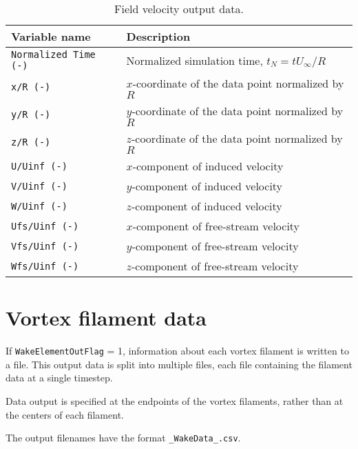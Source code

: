 \begin{table}[!htbp]
\centering
\caption{Field velocity output data.}
\label{tbl:output_cartesian_velocity}
\begin{tabular}{p{}p{}}
\toprule
Variable name & Description \\ \midrule
\texttt{Normalized Time (-)} & Normalized simulation time, $t_N=t U_\infty/R$ \\
\texttt{x/R (-)}             & $x$-coordinate of the data point normalized by $R$ \\
\texttt{y/R (-)}             & $y$-coordinate of the data point normalized by $R$ \\
\texttt{z/R (-)}             & $z$-coordinate of the data point normalized by $R$ \\
\texttt{U/Uinf (-)}          & $x$-component of induced velocity              \\
\texttt{V/Uinf (-)}          & $y$-component of induced velocity              \\
\texttt{W/Uinf (-)}          & $z$-component of induced velocity              \\
\texttt{Ufs/Uinf (-)}        & $x$-component of free-stream velocity          \\
\texttt{Vfs/Uinf (-)}        & $y$-component of free-stream velocity          \\
\texttt{Wfs/Uinf (-)}        & $z$-component of free-stream velocity          \\
\bottomrule
\end{tabular}
\end{table}

\section{Vortex filament data}
If \texttt{WakeElementOutFlag} = 1, information about each vortex filament is written to a file. This output data is split into multiple files, each file containing the filament data at a single timestep.

Data output is specified at the endpoints of the vortex filaments, rather than at the centers of each filament.

The output filenames have the format \texttt{\_WakeData\_.csv}.

